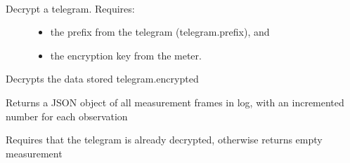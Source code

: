\documentclass[letterpaper,10pt,english]{sphinxmanual}
\begin{document}
\begin{fulllineitems}
\begin{fulllineitems}
\label{\detokenize{omnipower:OmniPower.OmniPower.OmniPower.decrypt}}~\begin{description}
\item[{Decrypt a telegram. Requires:}] \leavevmode\begin{itemize}
\item {} 
the prefix from the telegram (telegram.prefix), and

\item {} 
the encryption key from the meter.

\end{itemize}

\end{description}

Decrypts the data stored telegram.encrypted

\end{fulllineitems}


\begin{fulllineitems}
\label{\detokenize{omnipower:OmniPower.OmniPower.OmniPower.dump_log_to_json}}
Returns a JSON object of all measurement frames in log, with an incremented number for each observation

\end{fulllineitems}


\begin{fulllineitems}
\label{\detokenize{omnipower:OmniPower.OmniPower.OmniPower.extract_measurement_frame}}
Requires that the telegram is already decrypted, otherwise returns empty measurement


\end{fulllineitems}
\end{fulllineitems}
\end{document}
